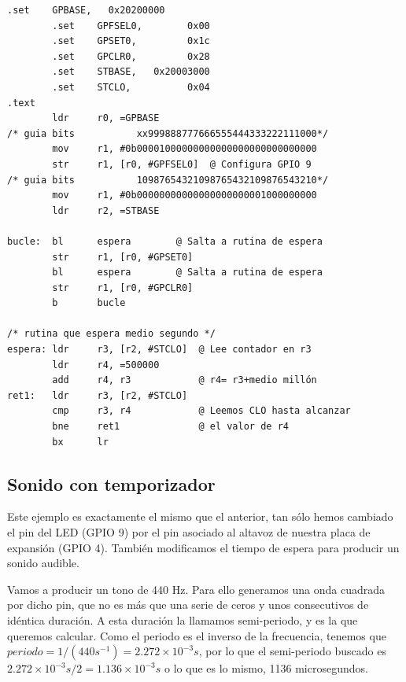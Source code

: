 \begin{lstlisting}[caption={esbn5.s},label={lst:codigoPract4_5}]
        .set    GPBASE,   0x20200000
        .set    GPFSEL0,        0x00
        .set    GPSET0,         0x1c
        .set    GPCLR0,         0x28
        .set    STBASE,   0x20003000
        .set    STCLO,          0x04
.text
        ldr     r0, =GPBASE
/* guia bits           xx999888777666555444333222111000*/
        mov     r1, #0b00001000000000000000000000000000
        str     r1, [r0, #GPFSEL0]  @ Configura GPIO 9
/* guia bits           10987654321098765432109876543210*/
        mov     r1, #0b00000000000000000000001000000000
        ldr     r2, =STBASE

bucle:  bl      espera        @ Salta a rutina de espera
        str     r1, [r0, #GPSET0]
        bl      espera        @ Salta a rutina de espera
        str     r1, [r0, #GPCLR0]
        b       bucle

/* rutina que espera medio segundo */
espera: ldr     r3, [r2, #STCLO]  @ Lee contador en r3
        ldr     r4, =500000
        add     r4, r3            @ r4= r3+medio millón
ret1:   ldr     r3, [r2, #STCLO]
        cmp     r3, r4            @ Leemos CLO hasta alcanzar
        bne     ret1              @ el valor de r4
        bx      lr
\end{lstlisting}

\subsection{Sonido con temporizador}

Este ejemplo es exactamente el mismo que el anterior, tan sólo hemos
cambiado el pin del LED (GPIO 9) por el pin asociado al altavoz de
nuestra placa de expansión (GPIO 4). También modificamos el tiempo
de espera para producir un sonido audible.

Vamos a producir un tono de 440 Hz. Para ello generamos una onda
cuadrada por dicho pin, que no es más que una serie de ceros y unos
consecutivos de idéntica duración. A esta duración la llamamos
semi-periodo, y es la que queremos calcular. Como el periodo es
el inverso de la frecuencia, tenemos que $periodo = 1/(440 s^{-1}) = 2.272\times10^{-3} s$,
por lo que el semi-periodo buscado es $2.272\times10^{-3}s/2=1.136\times10^{-3} s$ o lo
que es lo mismo, 1136 microsegundos.

